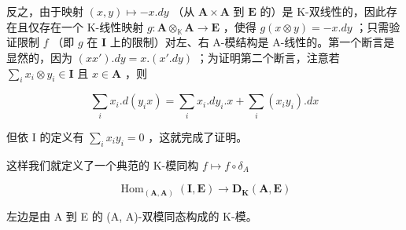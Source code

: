 反之，由于映射 \((x,y)\mapsto -x.dy\) （从 \(\mathbf{A}\times \mathbf{A}\) 到 \(\mathbf{E}\) 的）是 K-双线性的，因此存在且仅存在一个 K-线性映射 \(g:\mathbf{A}\otimes_{\mathbb{K}}\mathbf{A}\rightarrow \mathbf{E}\) ，使得 \(g(x\otimes y) = -x.dy\) ；只需验证限制 \(f\) （即 \(g\) 在 \(\mathbf{I}\) 上的限制）对左、右 A-模结构是 A-线性的。第一个断言是显然的，因为 \((xx') .dy = x.(x'.dy)\) ；为证明第二个断言，注意若 \(\sum_{i}x_{i}\otimes y_{i}\in \mathbf{I}\) 且 \(x\in \mathbf{A}\) ，则

\[
\sum_ {i} x _ {i}. d (y _ {i} x) = \sum_ {i} x _ {i}. d y _ {i}. x + \sum_ {i} (x _ {i} y _ {i}). d x
\]

但依 I 的定义有 \(\sum_{i}x_{i}y_{i} = 0\) ，这就完成了证明。

这样我们就定义了一个典范的 K-模同构 \(f \mapsto f \circ \delta_{A}\)

\[
\operatorname{Hom} _ {(\mathbf {A}, \mathbf {A})} (\mathbf {I}, \mathbf {E}) \rightarrow \mathbf {D} _ {\mathbf {K}} (\mathbf {A}, \mathbf {E})
\]

左边是由 A 到 E 的 (A, A)-双模同态构成的 K-模。
\relax{}
